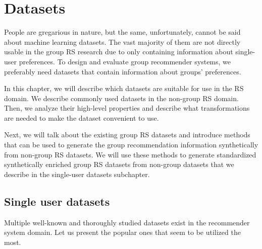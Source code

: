 

\chapter{Datasets}  \label{chap:datasets}
People are gregarious in nature, but the same, unfortunately, cannot be said about machine learning datasets. The vast majority of them are not directly usable in the group RS research due to only containing information about single-user preferences. To design and evaluate group recommender systems, we preferably need datasets that contain information about groups' preferences.

In this chapter, we will describe which datasets are suitable for use in the RS domain. We describe commonly used datasets in the non-group RS domain. Then, we analyze their high-level properties and describe what transformations are needed to make the dataset convenient to use. 

Next, we will talk about the existing group RS datasets and introduce methods that can be used to generate the group recommendation information synthetically from non-group RS datasets. We will use these methods to generate standardized synthetically enriched group RS datasets from non-group datasets that we describe in the single-user datasets subchapter.



\section{Single user datasets} \label{sec:single_user_datasets}
Multiple well-known and thoroughly studied datasets exist in the recommender system domain. Let us present the popular ones that seem to be utilized the most.

